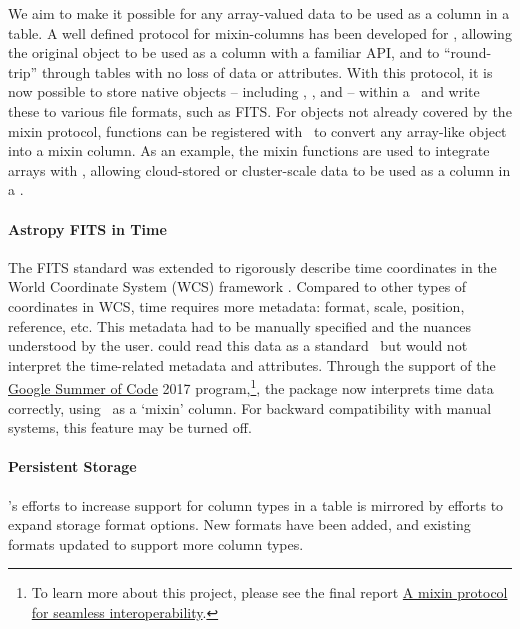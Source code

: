 \documentclass[modern]{aastex631}
\begin{document}
We aim to make it possible for any array-valued data to be used as a column in a
table. A well defined protocol for mixin-columns has been developed for
\astropytable, allowing the original object to be used as a column with a
familiar API, and to ``round-trip'' through tables with no loss of data or
attributes. With this protocol, it is now possible to store \astropy native
objects -- including \astropyTime, \astropyQuantity, and \astropySkyCoord --
within a \astropyTable\ and write these to various file formats, such as FITS.
For objects not already covered by the mixin protocol, functions can be
registered with \astropyTable\ to convert any array-like object into a mixin
column. As an example, the mixin functions are used to integrate 
arrays with \astropyTable, allowing cloud-stored or cluster-scale data to be
used as a column in a \astropyTable.

\paragraph{Astropy FITS in Time}

The FITS standard was extended to rigorously describe time coordinates in the
World Coordinate System (WCS) framework \citep{FITS-Time:2015}. Compared to
other types of coordinates in WCS, time requires more metadata: format, scale,
position, reference, etc. This metadata had to be manually specified and the
nuances understood by the user. \astropyfits could read this data as a standard
\astropyFitsColumn\, but would not interpret the time-related metadata and
attributes. Through the support of the
\href{https://summerofcode.withgoogle.com/archive/2017/projects/4778482366152704}{Google
Summer of Code} 2017 program,\footnote{ To learn more about this project, please
see the final report
\href{https://aaryapatil.wordpress.com/2017/08/28/a-mixin-protocol-for-seamless-interoperability/}{A
mixin protocol for seamless interoperability}.}, the \astropyfits package now
interprets time data correctly, using \astropyTime\ as a `mixin' column. For
backward compatibility with manual systems, this feature may be turned off.

\paragraph{Persistent Storage}

\astropy's efforts to increase support for column types in a table is mirrored
by efforts to expand storage format options. New formats have been added, and
existing formats updated to support more column types.
\end{document}
